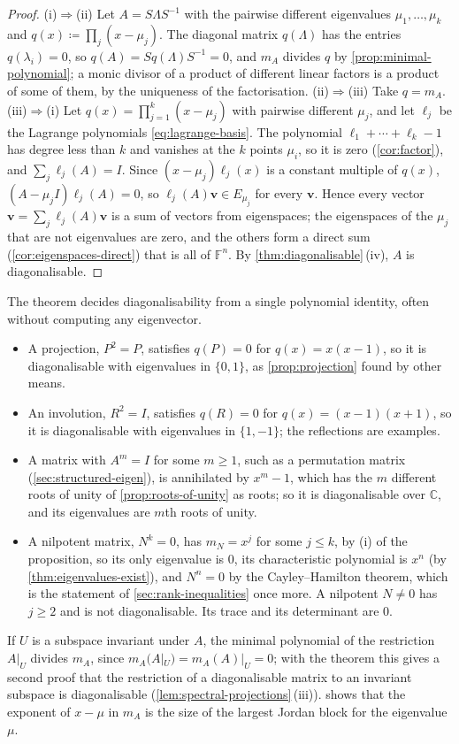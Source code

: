 \begin{proof}
(i)$\Rightarrow$(ii) Let $A=S\Lambda S^{-1}$ with the pairwise different eigenvalues $\mu_1,\ldots,\mu_k$ and $q(x)\coloneqq\prod_j(x-\mu_j)$. The diagonal matrix $q(\Lambda)$ has the entries $q(\lambda_i)=0$, so $q(A)=Sq(\Lambda)S^{-1}=0$, and $m_A$ divides $q$ by \cref{prop:minimal-polynomial}; a monic divisor of a product of different linear factors is a product of some of them, by the uniqueness of the factorisation. (ii)$\Rightarrow$(iii) Take $q=m_A$. (iii)$\Rightarrow$(i) Let $q(x)=\prod_{j=1}^k(x-\mu_j)$ with pairwise different $\mu_j$, and let $\ell_j$ be the Lagrange polynomials \eqref{eq:lagrange-basis}. The polynomial $\ell_1+\cdots+\ell_k-1$ has degree less than $k$ and vanishes at the $k$ points $\mu_i$, so it is zero (\cref{cor:factor}), and $\sum_j\ell_j(A)=I$. Since $(x-\mu_j)\ell_j(x)$ is a constant multiple of $q(x)$, $(A-\mu_jI)\ell_j(A)=0$, so $\ell_j(A)\mathbf v\in E_{\mu_j}$ for every $\mathbf v$. Hence every vector $\mathbf v=\sum_j\ell_j(A)\mathbf v$ is a sum of vectors from eigenspaces; the eigenspaces of the $\mu_j$ that are not eigenvalues are zero, and the others form a direct sum (\cref{cor:eigenspaces-direct}) that is all of $\mathbb F^n$. By \cref{thm:diagonalisable}\,(iv), $A$ is diagonalisable.
\end{proof}

The theorem decides diagonalisability from a single polynomial identity, often without computing any eigenvector.
\begin{itemize}
\item A projection, $P^2=P$, satisfies $q(P)=0$ for $q(x)=x(x-1)$, so it is diagonalisable with eigenvalues in $\{0,1\}$, as \cref{prop:projection} found by other means.
\item An involution, $R^2=I$, satisfies $q(R)=0$ for $q(x)=(x-1)(x+1)$, so it is diagonalisable with eigenvalues in $\{1,-1\}$; the reflections are examples.
\item A matrix with $A^m=I$ for some $m\ge1$, such as a permutation matrix (\cref{sec:structured-eigen}), is annihilated by $x^m-1$, which has the $m$ different roots of unity of \cref{prop:roots-of-unity} as roots; so it is diagonalisable over $\mathbb C$, and its eigenvalues are $m$th roots of unity.
\item A nilpotent matrix, $N^k=0$, has $m_N=x^j$ for some $j\le k$, by (i) of the proposition, so its only eigenvalue is $0$, its characteristic polynomial is $x^n$ (by \cref{thm:eigenvalues-exist}), and $N^n=0$ by the Cayley--Hamilton theorem, which is the statement of \cref{sec:rank-inequalities} once more. A nilpotent $N\ne0$ has $j\ge2$ and is not diagonalisable. Its trace and its determinant are $0$.
\end{itemize}
If $U$ is a subspace invariant under $A$, the minimal polynomial of the restriction $A|_U$ divides $m_A$, since $m_A(A|_U)=m_A(A)|_U=0$; with the theorem this gives a second proof that the restriction of a diagonalisable matrix to an invariant subspace is diagonalisable (\cref{lem:spectral-projections}\,(iii)).  shows that the exponent of $x-\mu$ in $m_A$ is the size of the largest Jordan block for the eigenvalue $\mu$.

